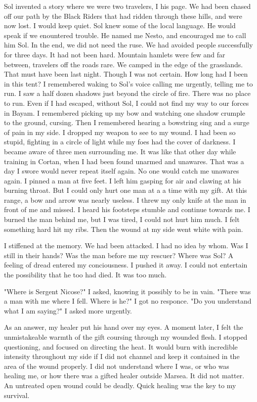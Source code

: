 \documentclass{article}
\begin{document}
Sol invented a story where we were two travelers, I his page. We had been chased off our path by the Black Riders that had ridden through these hills, and were now lost. I would keep quiet. Sol knew some of the local language. He would speak if we enountered trouble. He named me Nesto, and encouraged me to call him Sol. In the end, we did not need the ruse. We had avoided people successfully for three days. It had not been hard. Mountain hamlets were few and far between, travelers off the roads rare. We camped in the edge of the grasslands. That must have been last night. Though I was not certain. How long had I been in this tent? I remembered waking to Sol's voice calling me urgently, telling me to run. I saw a half dozen shadows just beyond the circle of fire. There was no place to run. Even if I had escaped, without Sol, I could not find my way to our forces in Bayam. I remembered picking up my bow and watching one shadow crumple to the ground, cursing. Then I remembered hearing a bowstring sing and a surge of pain in my side. I dropped my weapon to see to my wound. I had been so stupid, fighting in a circle of light while my foes had the cover of darkness. I became aware of three men surrounding me. It was like that other day while training in Cortan, when I had been found unarmed and unawares. That was a day I swore would never repeat itself again. No one would catch me unawares again. I pinned a man at five feet. I left him gasping for air and clawing at his burning throat. But I could only hurt one man at a a time with my gift. At this range, a bow and arrow was nearly useless. I threw my only knife at the man in front of me and missed. I heard his footsteps stumble and continue towards me. I burned the man behind me, but I was tired, I could not hurt him much. I felt something hard hit my ribs. Then the wound at my side went white with pain. 

I stiffened at the memory. We had been attacked. I had no idea by whom. Was I still in their hands? Was the man before me my rescuer? Where was Sol? A feeling of dread entered my conciousness. I pushed it away. I could not entertain the possibility that he too had died. It was too much.

"Where is Sergent Nicose?" I asked, knowing it possibly to be in vain. "There was a man with me where I fell. Where is he?" I got no responce. "Do you understand what I am saying?" I asked more urgently. 

As an answer, my healer put his hand over my eyes. A moment later, I felt the unmistakeable warmth of the gift coursing through my wounded flesh. I stopped questioning, and focused on directing the heat. It would burn with incredible intensity throughout my side if I did not channel and keep it contained in the area of the wound properly. I did not understand where I was, or who was healing me, or how there was a gifted healer outside Marsea. It did not matter. An untreated open wound could be deadly. Quick healing was the key to my survival. 
\end{document}
